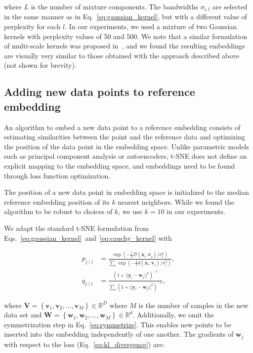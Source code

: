 \documentclass[runningheads]{llncs}
\begin{document}
\noindent where $L$ is the number of mixture components. The bandwidths
$\sigma_{i,l}$ are selected in the same manner as in
Eq.~\ref{eq:gaussian_kernel}, but with a different value of perplexity for each
$l$. In our experiments, we used a mixture of two Gaussian kernels with
perplexity values of 50 and 500. We note that a similar formulation of
multi-scale kernels was proposed in~\cite{art_of_using_tsne}, and we found the
resulting embeddings are visually very similar to those obtained with the
approach described above (not shown for brevity).


\subsection{Adding new data points to reference embedding\label{sec:transfer}}

An algorithm to embed a new data point to a reference embedding consists of
estimating similarities between the point and the reference data and optimizing
the position of the data point in the embedding space. Unlike parametric models
such as principal component analysis or autoencoders, t-SNE does not define an
explicit mapping to the embedding space, and embeddings need to be found through
loss function optimization.

The position of a new data
point in embedding space is initialized 
to the median reference embedding position of its $k$ nearest 
neighbors. While we found the algorithm to be
robust to choices of $k$, we use $k=10$ in our experiments.

We adapt the standard t-SNE formulation from
Eqs.~\ref{eq:gaussian_kernel}~and~\ref{eq:cauchy_kernel} with

\begin{align}
p_{j \mid i} &= \frac{\exp \left ( -\frac{1}{2} \mathcal{D}(\mathbf{x}_i, \mathbf{v}_j) / \sigma_i^2 \right )}{\sum_{i} \exp \left ( -\frac{1}{2} d(\mathbf{x}_i, \mathbf{v}_j) / \sigma_i^2 \right )}, \\
q_{j \mid i} &= \frac{\left ( 1 + || \mathbf{y}_i - \mathbf{w}_j ||^2 \right )^{-1}}{\sum_{i}\left ( 1 + || \mathbf{y}_i - \mathbf{w}_j ||^2 \right )^{-1}},
\end{align}

\noindent where $\mathbf{V} = \left \{ \mathbf{v}_1, \mathbf{v}_2, \dots,
\mathbf{v}_M \right \} \in \mathbb{R}^D$ where $M$ is the number of samples in
the new data set and $\mathbf{W} = \left \{ \mathbf{w}_1, \mathbf{w}_2, \dots,
\mathbf{w}_M \right \} \in \mathbb{R}^d$. Additionally, we omit the
symmetrization step in Eq.~\ref{eq:symmetrize}. This enables new points to be
inserted into the embedding independently of one another. The gradients of
$\mathbf{w}_j$ with respect to the loss (Eq.~\ref{eq:kl_divergence}) are:
\end{document}

